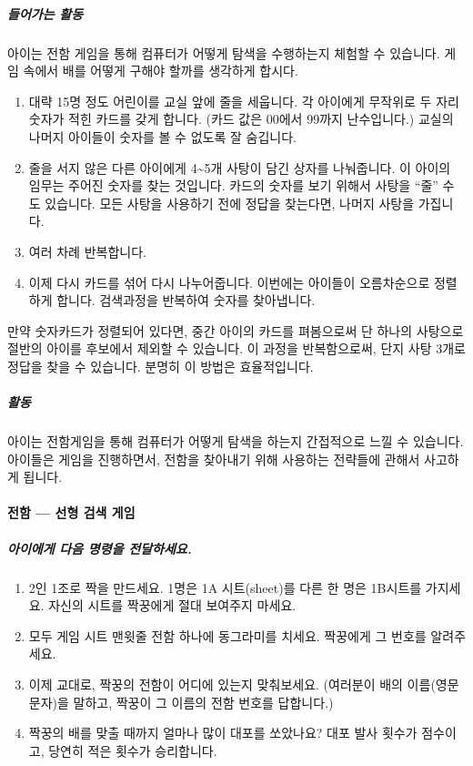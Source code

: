 \documentclass[]{article}
\begin{document}
\subparagraph{들어가는 활동}\label{section-92}

아이는 전함 게임을 통해 컴퓨터가 어떻게 탐색을 수행하는지 체험할 수
있습니다. 게임 속에서 배를 어떻게 구해야 할까를 생각하게 합시다.

\begin{enumerate}
\itemsep1pt\parskip0pt
\item
  대략 15명 정도 어린이를 교실 앞에 줄을 세웁니다. 각 아이에게 무작위로
  두 자리 숫자가 적힌 카드를 갖게 합니다. (카드 값은 00에서 99까지
  난수입니다.) 교실의 나머지 아이들이 숫자를 볼 수 없도록 잘 숨깁니다.
\item
  줄을 서지 않은 다른 아이에게 4\textasciitilde{}5개 사탕이 담긴 상자를
  나눠줍니다. 이 아이의 임무는 주어진 숫자를 찾는 것입니다. 카드의
  숫자를 보기 위해서 사탕을 ``줄'' 수도 있습니다. 모든 사탕을 사용하기
  전에 정답을 찾는다면, 나머지 사탕을 가집니다.
\item
  여러 차례 반복합니다.
\item
  이제 다시 카드를 섞어 다시 나누어줍니다. 이번에는 아이들이
  오름차순으로 정렬하게 합니다. 검색과정을 반복하여 숫자를 찾아냅니다.
\end{enumerate}

만약 숫자카드가 정렬되어 있다면, 중간 아이의 카드를 펴봄으로써 단 하나의
사탕으로 절반의 아이를 후보에서 제외할 수 있습니다. 이 과정을
반복함으로써, 단지 사탕 3개로 정답을 찾을 수 있습니다. 분명히 이 방법은
효율적입니다.

\subparagraph{활동}\label{section-93}

아이는 전함게임을 통해 컴퓨터가 어떻게 탐색을 하는지 간접적으로 느낄 수
있습니다. 아이들은 게임을 진행하면서, 전함을 찾아내기 위해 사용하는
전략들에 관해서 사고하게 됩니다.

\mbox{}\paragraph{전함 --- 선형 검색 게임}\label{mdash---}

\subparagraph{아이에게 다음 명령을 전달하세요.}\label{section-94}

\begin{enumerate}
\item
  2인 1조로 짝을 만드세요. 1명은 1A 시트(sheet)를 다른 한 명은 1B시트를
  가지세요. 자신의 시트를 짝꿍에게 절대 보여주지 마세요.
\item
  모두 게임 시트 맨윗줄 전함 하나에 동그라미를 치세요. 짝꿍에게 그
  번호를 알려주세요.
\item
  이제 교대로, 짝꿍의 전함이 어디에 있는지 맞춰보세요. (여러분이 배의
  이름(영문 문자)을 말하고, 짝꿍이 그 이름의 전함 번호를 답합니다.)
\item
  짝꿍의 배를 맞출 때까지 얼마나 많이 대포를 쏘았나요? 대포 발사 횟수가
  점수이고, 당연히 적은 횟수가 승리합니다.
\end{enumerate}
\end{document}
